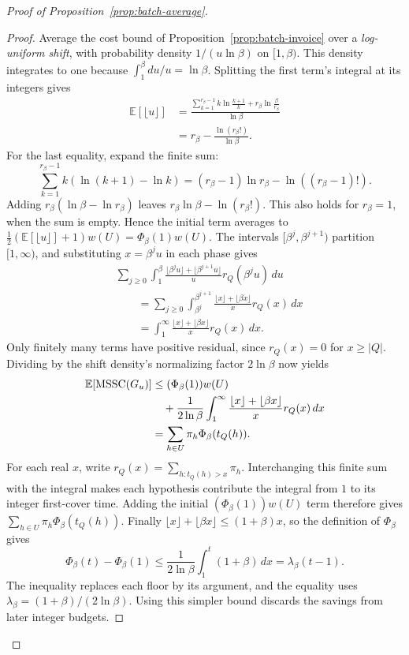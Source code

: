 \begin{proof}[Proof of Proposition~\ref{prop:batch-average}]
\begin{proof}
Average the cost bound of Proposition~\ref{prop:batch-invoice} over
a \emph{log-uniform shift}, with
probability density $1/(u\ln\beta)$ on $[1,\beta)$. This density
integrates to one because $\int_1^\beta du/u=\ln\beta$.
Splitting the first term's integral at its integers
gives
\[
 \begin{aligned}
 \mathbb E[\lfloor u\rfloor]
 &=\frac{\displaystyle
     \sum_{k=1}^{r_\beta-1}k\ln\frac{k+1}{k}
        +r_\beta\ln\frac{\beta}{r_\beta}}{\ln\beta}\\
 &=r_\beta-\frac{\ln(r_\beta!)}{\ln\beta}.
 \end{aligned}
\]
For the last equality, expand the finite sum:
\[
 \sum_{k=1}^{r_\beta-1}k(\ln(k+1)-\ln k)
 =(r_\beta-1)\ln r_\beta-\ln((r_\beta-1)!).
\]
Adding $r_\beta(\ln\beta-\ln r_\beta)$ leaves
$r_\beta\ln\beta-\ln(r_\beta!)$. This also holds for $r_\beta=1$,
when the sum is empty. Hence the initial term averages to
$\tfrac12(\mathbb E[\lfloor u\rfloor]+1)w(U)=\Phi_\beta(1)w(U)$.
The intervals $[\beta^j,\beta^{j+1})$ partition $[1,\infty)$,
and substituting $x=\beta^ju$ in each phase gives
\[
\begin{aligned}
 &\sum_{j\ge0}\int_1^\beta
 \frac{\lfloor\beta^ju\rfloor+\lfloor\beta^{j+1}u\rfloor}{u}
 r_Q(\beta^ju)\,du\\
 &\qquad=\sum_{j\ge0}\int_{\beta^j}^{\beta^{j+1}}
 \frac{\lfloor x\rfloor+\lfloor\beta x\rfloor}{x}r_Q(x)\,dx\\
 &\qquad=\int_1^\infty
 \frac{\lfloor x\rfloor+\lfloor\beta x\rfloor}{x}r_Q(x)\,dx.
\end{aligned}
\]
Only finitely many terms have positive residual, since
$r_Q(x)=0$ for $x\ge |Q|$. Dividing by the shift density's
normalizing factor $2\ln\beta$ now yields
\[
 \begin{aligned}
 \mathbb E[\operatorname{MSSC}(G_u)]
 &\le(\Phi_\beta(1))w(U)\\
 &\quad+\frac1{2\ln\beta}\int_1^\infty
      \frac{\lfloor x\rfloor+\lfloor\beta x\rfloor}{x}
      r_Q(x)\,dx\\
 &=\sum_{h\in U}\pi_h\Phi_\beta(t_Q(h)).
 \end{aligned}
\]
For each real $x$, write
$r_Q(x)=\sum_{h:t_Q(h)>x}\pi_h$. Interchanging this finite sum
with the integral makes each hypothesis contribute the integral
from $1$ to its integer first-cover time. Adding the initial
$(\Phi_\beta(1))w(U)$ term therefore gives
$\sum_{h\in U}\pi_h\Phi_\beta(t_Q(h))$.
Finally $\lfloor x\rfloor+\lfloor\beta x\rfloor\le(1+\beta)x$,
so the definition of $\Phi_\beta$ gives
\[
 \Phi_\beta(t)-\Phi_\beta(1)
 \le\frac1{2\ln\beta}\int_1^t(1+\beta)\,dx
 =\lambda_\beta(t-1).
\]
The inequality replaces each floor by its argument, and the
equality uses $\lambda_\beta=(1+\beta)/(2\ln\beta)$.
Using this simpler bound discards the savings from later integer budgets.


\end{proof}
\end{proof}
